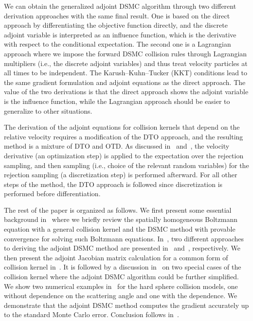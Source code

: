 \documentclass[12pt,nopreprintline]{elsarticle}
\begin{document}
We can obtain the generalized adjoint DSMC algorithm through two different derivation approaches with the same final result. One is based on the direct approach by differentiating the objective function directly, and the discrete adjoint variable is interpreted as an influence function, which is the derivative with respect to the conditional expectation. The second one is a Lagrangian approach where we impose the forward DSMC collision rules through 
Lagrangian multipliers (i.e., the discrete adjoint variables) and thus treat velocity particles at all times to be independent. The Karush–Kuhn–Tucker (KKT) conditions lead to the same gradient formulation and adjoint equations as the direct approach.
The value of the two derivations is that the direct approach shows the adjoint variable is the influence function, while the Lagrangian approach should be easier to generalize to other situations. 

The derivation of the adjoint equations for collision kernels that depend on the relative velocity requires a modification of the DTO approach, and the resulting method is a mixture of DTO and OTD. As discussed in~ and~, the velocity derivative (an optimization step) is applied to the expectation over the rejection sampling, and then sampling (i.e., choice of the relevant random variables) for the rejection sampling (a discretization step) is performed afterward. For all other steps of the method, the DTO approach is followed since discretization is performed before differentiation. 

The rest of the paper is organized as follows. We first present some essential background in~ where we briefly review the spatially homogeneous Boltzmann equation with a general collision kernel and the DSMC method with provable convergence for solving such Boltzmann equations. In~, two different approaches to deriving the adjoint DSMC method are presented in~ and~, respectively. We then present the adjoint Jacobian matrix calculation for a common form of collision kernel in~. It is followed by a discussion in~ on two special cases of the collision kernel where the adjoint DSMC algorithm could be further simplified. We show two numerical examples in~ for the hard sphere collision models, one without dependence on the scattering angle and one with the dependence. We demonstrate that the adjoint DSMC method computes the gradient accurately up to the standard Monte Carlo error. Conclusion follows in~.
 
\end{document}
